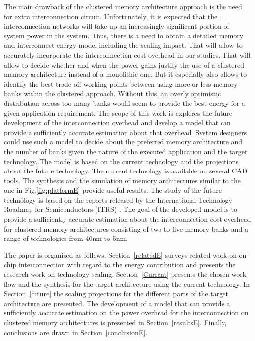  The main drawback of the clustered memory architecture approach is the need for extra interconnection circuit.
 Unfortunately, it is expected that the interconnection networks will take up an increasingly significant portion of system power in the system. 
Thus, there is a need to obtain a detailed memory and interconnect energy model including the scaling impact. 
That will allow to accurately incorporate the interconnection cost overhead in our studies. 
That will allow to decide whether and when the power gains justify the use of a clustered memory architecture instead of a monolithic one. 
But it especially also allows to identify the best trade-off working points between using more
or less memory banks within the clustered approach. 
Without this, an overly optimistic distribution across too many banks would seem to provide the best energy for a given application requirement.
  The scope of this work is explores the future development of the interconnection overhead and develop a model that can provide a sufficiently accurate estimation about that overhead.
  System designers could use such a model to decide about the preferred memory architecture and the number of banks given the nature of the executed application and the target technology.
  The model is based on the current technology and the projections about the future technology.
  The current technology is available on several CAD tools.
  The synthesis and the simulation of memory architectures similar to the one in Fig.\ref{fig:platformE} provide useful results.
  The study of the future technology is based on the reports released by the International Technology Roadmap for Semiconductors (ITRS) \cite{itrs}.
 The goal of the developed model is to provide a sufficiently accurate estimation about the interconnection cost overhead for clustered memory architectures consisting of two to five memory banks and a range of technologies from 40nm to 5nm.  
 
The paper is organized as follows.
Section~\ref{relatedE} surveys related work on on-chip interconnection with regard to the energy contribution and presents the research work on technology scaling. 
Section~\ref{Current} presents the chosen work-flow and the synthesis for the target architecture using the current technology.
In Section~\ref{future} the scaling projections for the different parts of the target architecture are presented.
The development of a model that can provide a sufficiently accurate estimation on the power overhead for the interconnection on clustered memory architectures is presented in Section~\ref{resultsE}.
Finally, conclusions are drawn in Section~\ref{conclusionE}.

